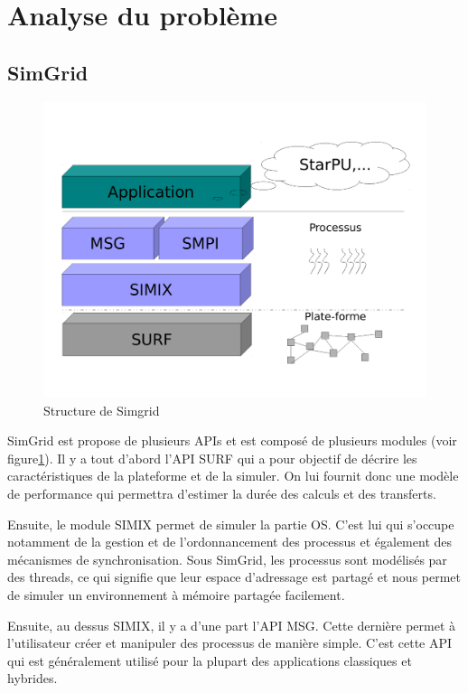 \documentclass[smallextended]{svjour3}
\begin{document}
\section{Analyse du problème}
\label{sec-3}
\subsection{SimGrid}
\label{sec-3-1}
\begin{figure}[tbh]
\centering
\includegraphics[width=.8\linewidth]{./Img/Simgrid.pdf}
\caption{\label{fig:1}Structure de Simgrid}
\end{figure}

SimGrid est propose de plusieurs APIs et est composé de plusieurs
modules (voir figure\ref{fig:1}). Il y a tout d'abord l'API SURF qui a pour objectif de
décrire les caractéristiques de la plateforme et de la simuler. On
lui fournit donc une modèle de performance qui permettra d'estimer
la durée des calculs et des transferts.

Ensuite, le module SIMIX permet de simuler la partie OS. C'est lui
qui s'occupe notamment de la gestion et de l'ordonnancement des
processus et également des mécanismes de synchronisation. Sous
SimGrid, les processus sont modélisés par des threads, ce qui
signifie que leur espace d'adressage est partagé et nous permet
de simuler un environnement à mémoire partagée facilement. 

Ensuite, au dessus SIMIX, il y a d'une part l'API MSG. Cette dernière
permet à l'utilisateur créer et manipuler des processus de manière
simple. C'est cette API qui est généralement utilisé pour la
plupart des applications classiques et hybrides. 
\end{document}
